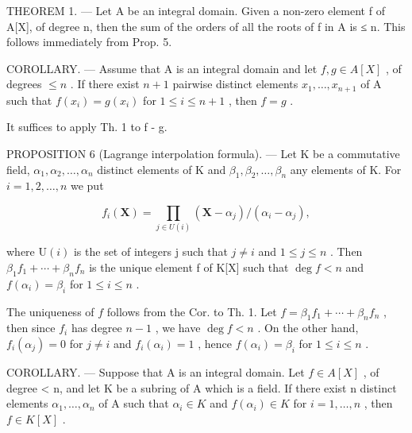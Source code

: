 THEOREM 1. --- Let A be an integral domain. Given a non-zero element f of A{[}X{]}, of degree n, then the sum of the orders of all the roots of f in A is ≤ n. This follows immediately from Prop. 5.

COROLLARY. --- Assume that A is an integral domain and let \(f, g \in A[X]\) , of degrees \(\leqslant n\) . If there exist \(n+1\) pairwise distinct elements \(x_{1}, \ldots, x_{n+1}\) of A such that \(f(x_{i}) = g(x_{i})\) for \(1 \leqslant i \leqslant n+1\) , then \(f = g\) .

It suffices to apply Th. 1 to f - g.

PROPOSITION 6 (Lagrange interpolation formula). --- Let K be a commutative field, \(\alpha_{1}, \alpha_{2}, \ldots, \alpha_{n}\) distinct elements of K and \(\beta_{1}, \beta_{2}, \ldots, \beta_{n}\) any elements of K. For \(i = 1, 2, \ldots, n\) we put

\[
f _ {i} (\mathbf {X}) = \prod_ {j \in U (i)} \left(\mathbf {X} - \alpha_ {j}\right) / \left(\alpha_ {i} - \alpha_ {j}\right),
\]

where \(\mathrm{U}(i)\) is the set of integers j such that \(j \neq i\) and \(1 \leqslant j \leqslant n\) . Then \(\beta_{1}f_{1} + \cdots + \beta_{n}f_{n}\) is the unique element f of K{[}X{]} such that \(\deg f < n\) and \(f(\alpha_{i}) = \beta_{i}\) for \(1 \leqslant i \leqslant n\) .

The uniqueness of \(f\) follows from the Cor. to Th. 1. Let \(f = \beta_{1}f_{1} + \cdots + \beta_{n}f_{n}\) , then since \(f_{i}\) has degree \(n - 1\) , we have \(\deg f < n\) . On the other hand, \(f_{i}(\alpha_{j}) = 0\) for \(j \neq i\) and \(f_{i}(\alpha_{i}) = 1\) , hence \(f(\alpha_{i}) = \beta_{i}\) for \(1 \leqslant i \leqslant n\) .

COROLLARY. --- Suppose that A is an integral domain. Let \(f \in A[X]\) , of degree \textless{} n, and let K be a subring of A which is a field. If there exist n distinct elements \(\alpha_{1}, \ldots, \alpha_{n}\) of A such that \(\alpha_{i} \in K\) and \(f(\alpha_{i}) \in K\) for \(i = 1, \ldots, n\) , then \(f \in K[X]\) .

